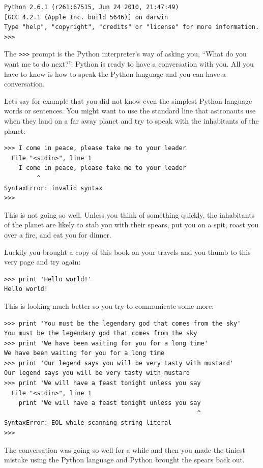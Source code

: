 \beforeverb
\begin{verbatim}
Python 2.6.1 (r261:67515, Jun 24 2010, 21:47:49) 
[GCC 4.2.1 (Apple Inc. build 5646)] on darwin
Type "help", "copyright", "credits" or "license" for more information.
>>> 
\end{verbatim}
\afterverb
%
The {\tt >>>} prompt is the Python interpreter's way of asking you, ``What
do you want me to do next?''.  Python is ready to have a conversation with
you.  All you have to know is how to speak the Python language and you 
can have a conversation.

Lets say for example that you did not know even the simplest Python language
words or sentences. You might want to use the standard line that astronauts 
use when they land on a far away planet and try to speak with the inhabitants
of the planet:

\beforeverb
\begin{verbatim}
>>> I come in peace, please take me to your leader
  File "<stdin>", line 1
    I come in peace, please take me to your leader
         ^
SyntaxError: invalid syntax
>>> 
\end{verbatim}
\afterverb
%
This is not going so well.  Unless you think of something quickly,
the inhabitants of the planet are likely to stab you with their spears, 
put you on a spit, roast you over a fire, and eat you for dinner.

Luckily you brought a copy of this book on your travels and you thumb to
this very page and try again:

\beforeverb
\begin{verbatim}
>>> print 'Hello world!'
Hello world!
\end{verbatim}
\afterverb
%
This is looking much better so you try to communicate some
more:

\beforeverb
\begin{verbatim}
>>> print 'You must be the legendary god that comes from the sky'
You must be the legendary god that comes from the sky
>>> print 'We have been waiting for you for a long time'
We have been waiting for you for a long time
>>> print 'Our legend says you will be very tasty with mustard'
Our legend says you will be very tasty with mustard
>>> print 'We will have a feast tonight unless you say
  File "<stdin>", line 1
    print 'We will have a feast tonight unless you say
                                                     ^
SyntaxError: EOL while scanning string literal
>>> 
\end{verbatim}
\afterverb
%
The conversation was going so well for a while and then you
made the tiniest mistake using the Python language and Python 
brought the spears back out.

